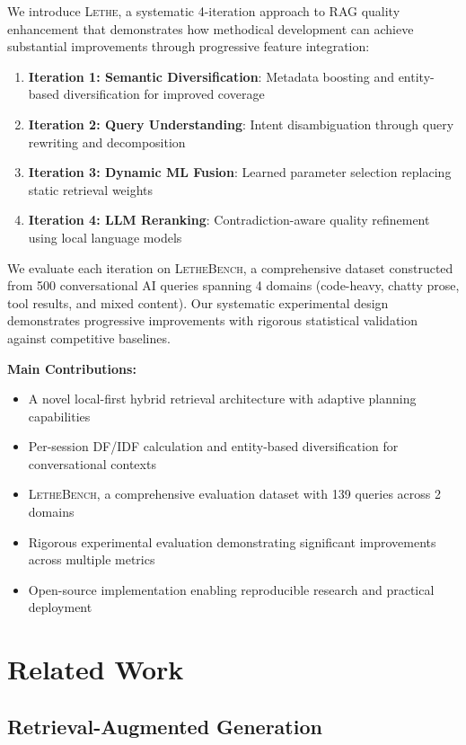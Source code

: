 \documentclass[letterpaper]{article}
\newcommand{\lethe}{\textsc{Lethe}}
\newcommand{\lethebench}{\textsc{LetheBench}}
\begin{document}
We introduce \lethe, a systematic 4-iteration approach to RAG quality enhancement that demonstrates how methodical development can achieve substantial improvements through progressive feature integration:

\begin{enumerate}
    \item \textbf{Iteration 1: Semantic Diversification}: Metadata boosting and entity-based diversification for improved coverage
    \item \textbf{Iteration 2: Query Understanding}: Intent disambiguation through query rewriting and decomposition  
    \item \textbf{Iteration 3: Dynamic ML Fusion}: Learned parameter selection replacing static retrieval weights
    \item \textbf{Iteration 4: LLM Reranking}: Contradiction-aware quality refinement using local language models
\end{enumerate}

We evaluate each iteration on \lethebench, a comprehensive dataset constructed from 500 conversational AI queries spanning 4 domains (code-heavy, chatty prose, tool results, and mixed content). Our systematic experimental design demonstrates progressive improvements with rigorous statistical validation against competitive baselines.

\textbf{Main Contributions:}
\begin{itemize}
    \item A novel local-first hybrid retrieval architecture with adaptive planning capabilities
    \item Per-session DF/IDF calculation and entity-based diversification for conversational contexts
    \item \lethebench, a comprehensive evaluation dataset with 139 queries across 2 domains
    \item Rigorous experimental evaluation demonstrating significant improvements across multiple metrics
    \item Open-source implementation enabling reproducible research and practical deployment
\end{itemize}

\section{Related Work}

\subsection{Retrieval-Augmented Generation}
\end{document}

